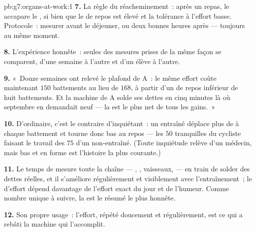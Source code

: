 \begin{solution}{pb:g7:organs-at-work:1}
\textbf{7.} La règle du réacheminement~: après un repas, le  accapare le , si bien que le  de repos est élevé
et la tolérance à l'effort basse. Protocole~: mesurer avant le
déjeuner, ou deux bonnes heures après --- toujours au même moment.

\textbf{8.} L'expérience honnête~: seules des mesures prises de la
même façon se comparent, d'une semaine à l'autre et d'un élève à
l'autre.

\textbf{9.} «~Douze semaines ont relevé le plafond de A~: le même
effort coûte maintenant $150$ battements au lieu de $168$, à partir
d'un  de repos inférieur de huit battements. Et la machine de A
solde ses dettes en cinq minutes là où septembre en demandait neuf
--- la  est le plus net de tous les gains.~»

\textbf{10.} D'ordinaire, c'est le contraire d'inquiétant~: un 
entraîné déplace plus de  à chaque battement et tourne donc bas
au repos --- les $50$ tranquilles du cycliste faisant le travail des
$75$ d'un non-entraîné. (Toute inquiétude relève d'un médecin, mais
bas et en forme est l'histoire la plus courante.)

\textbf{11.} Le temps de  mesure toute la chaîne ---
, , vaisseaux,  --- en train de solder des dettes
réelles, et il s'améliore régulièrement et visiblement avec
l'entraînement~; le  d'effort dépend davantage de l'effort
exact du jour et de l'humeur. Comme nombre unique à suivre, la
 est le résumé le plus honnête.

\textbf{12.} Son propre usage~: l'effort, répété doucement et
régulièrement, est ce qui a rebâti la machine qui l'accomplit.
\end{solution}
